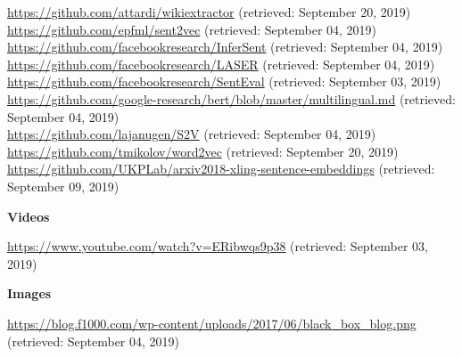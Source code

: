 \url{https://github.com/attardi/wikiextractor} (retrieved: September 20, 2019) \\[2mm]
\url{https://github.com/epfml/sent2vec} (retrieved: September 04, 2019) \\[2mm]
\url{https://github.com/facebookresearch/InferSent} (retrieved: September 04, 2019) \\[2mm]
\url{https://github.com/facebookresearch/LASER} (retrieved: September 04, 2019) \\[2mm]
\url{https://github.com/facebookresearch/SentEval} (retrieved: September 03, 2019) \\[2mm]
\url{https://github.com/google-research/bert/blob/master/multilingual.md} (retrieved: September 04, 2019) \\[2mm]
\url{https://github.com/lajanugen/S2V} (retrieved: September 04, 2019) \\[2mm]
\url{https://github.com/tmikolov/word2vec} (retrieved: September 20, 2019) \\[2mm]
\url{https://github.com/UKPLab/arxiv2018-xling-sentence-embeddings} (retrieved: September 09, 2019)

\textbf{Videos}

\url{https://www.youtube.com/watch?v=ERibwqs9p38} (retrieved: September 03, 2019)

\textbf{Images}

\url{https://blog.f1000.com/wp-content/uploads/2017/06/black_box_blog.png} (retrieved: September 04, 2019)